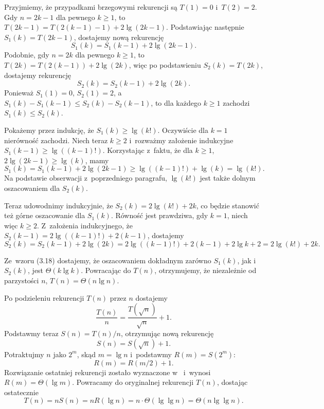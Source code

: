 \subproblem %
Przyjmiemy, że przypadkami brzegowymi rekurencji są $T(1)=0$ i~$T(2)=2$.
Gdy $n=2k-1$ dla pewnego $k\ge1$, to $T(2k-1)=T(2(k-1)-1)+2\lg(2k-1)$.
Podstawiając następnie $S_1(k)=T(2k-1)$, dostajemy nową rekurencję
\[
	S_1(k) = S_1(k-1)+2\lg(2k-1).
\]
Podobnie, gdy $n=2k$ dla pewnego $k\ge1$, to $T(2k)=T(2(k-1))+2\lg(2k)$, więc po podstawieniu $S_2(k)=T(2k)$, dostajemy rekurencję
\[
	S_2(k) = S_2(k-1)+2\lg(2k).
\]
Ponieważ $S_1(1)=0$, $S_2(1)=2$, a~$S_1(k)-S_1(k-1)\le S_2(k)-S_2(k-1)$, to dla każdego $k\ge1$ zachodzi $S_1(k)\le S_2(k)$.

Pokażemy przez indukcję, że $S_1(k)\ge\lg(k!)$.
Oczywiście dla $k=1$ nierówność zachodzi.
Niech teraz $k\ge2$ i~rozważmy założenie indukcyjne $S_1(k-1)\ge\lg((k-1)!)$.
Korzystając z~faktu, że dla $k\ge1$, $2\lg(2k-1)\ge\lg(k)$, mamy
\[
	S_1(k) = S_1(k-1)+2\lg(2k-1) \ge \lg((k-1)!)+\lg(k) = \lg(k!).
\]
Na podstawie obserwacji z~poprzedniego paragrafu, $\lg(k!)$ jest także dolnym oszacowaniem dla $S_2(k)$.

Teraz udowodnimy indukcyjnie, że $S_2(k)=2\lg(k!)+2k$, co będzie stanowić też górne oszacowanie dla $S_1(k)$.
Równość jest prawdziwa, gdy $k=1$, niech więc $k\ge2$.
Z~założenia indukcyjnego, że $S_2(k-1)=2\lg((k-1)!)+2(k-1)$, dostajemy
\[
	S_2(k) = S_2(k-1)+2\lg(2k) = 2\lg((k-1)!)+2(k-1)+2\lg k+2 = 2\lg(k!)+2k.
\]

Ze~wzoru (3.18) dostajemy, że oszacowaniem dokładnym zarówno $S_1(k)$, jak i~$S_2(k)$, jest $\Theta(k\lg k)$.
Powracając do $T(n)$, otrzymujemy, że niezależnie od parzystości $n$, $T(n)=\Theta(n\lg n)$.

\subproblem %
Po podzieleniu rekurencji $T(n)$ przez $n$ dostajemy
\[
	\frac{T(n)}{n} = \frac{T(\!\sqrt{n})}{\sqrt{n}}+1.
\]
Podstawmy teraz $S(n)=T(n)/n$, otrzymując nową rekurencję
\[
	S(n) = S(\!\sqrt{n})+1.
\]
Potraktujmy $n$ jako $2^m$, skąd $m=\lg n$ i~podstawmy $R(m)=S(2^m)$:
\[
	R(m) = R(m/2)+1.
\]
Rozwiązanie ostatniej rekurencji zostało wyznaczone w~ i~wynosi $R(m)=\Theta(\lg m)$.
Powracamy do oryginalnej rekurencji $T(n)$, dostając ostatecznie
\[
	T(n) = nS(n) = nR(\lg n) = n\cdot\Theta(\lg\lg n) = \Theta(n\lg\lg n).
\]
